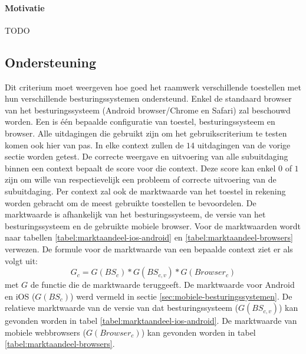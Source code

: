 \paragraph{Motivatie}
TODO


\subsection{Ondersteuning}
\label{sec:vergelijking-ondersteuning}
Dit criterium moet weergeven hoe goed het raamwerk verschillende toestellen met hun verschillende besturingssystemen ondersteund.
Enkel de standaard browser van het besturingssysteem (Android browser/Chrome en Safari) zal beschouwd worden.
Een  is één bepaalde configuratie van toestel, besturingssysteem en browser.
Alle uitdagingen die gebruikt zijn om het gebruikscriterium te testen komen ook hier van pas.
In elke context zullen de $14$ uitdagingen van de vorige sectie worden getest.
De correcte weergave en uitvoering van alle subuitdaging binnen een context bepaalt de score voor die context.
Deze score kan enkel $0$ of $1$ zijn om wille van respectievelijk een probleem of correcte uitvoering van de subuitdaging.
Per context zal ook de marktwaarde van het toestel in rekening worden gebracht om de meest gebruikte toestellen te bevoordelen.
De marktwaarde is afhankelijk van het besturingssysteem,  de versie van het besturingssysteem en de gebruikte mobiele browser.
Voor de marktwaarden wordt naar tabellen \ref{tabel:marktaandeel-ios-android} en \ref{tabel:marktaandeel-browsers} verwezen.
De formule voor de marktwaarde van een bepaalde context ziet er als volgt uit:
\begin{equation}
  G_c = G(BS_c)*G(BS_{c,v})*G(Browser_c)
 \label{eq:marktwaarde}
\end{equation}
met $G$ de functie die de marktwaarde teruggeeft.  
De marktwaarde voor Android en iOS ($G(BS_c)$) werd vermeld in sectie \ref{sec:mobiele-besturingssystemen}.
De relatieve marktwaarde van de versie van dat besturingssysteem ($G(BS_{c,v})$) kan gevonden worden in tabel \ref{tabel:marktaandeel-ios-android}.
De marktwaarde van mobiele webbrowsers ($G(Browser_c)$) kan gevonden worden in tabel \ref{tabel:marktaandeel-browsers}.

